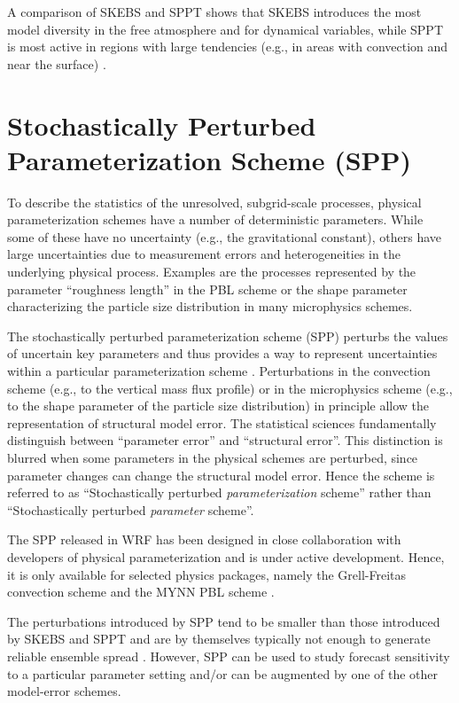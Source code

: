 A comparison of SKEBS and SPPT shows that SKEBS introduces the most model 
diversity in the free atmosphere and for dynamical variables, 
while SPPT is most active in regions with large tendencies (e.g., in areas with convection 
and near the surface) \citep{Be15}.
\section {Stochastically Perturbed Parameterization Scheme (SPP)}
To describe the statistics of the unresolved, subgrid-scale processes, 
physical parameterization schemes have a number of deterministic parameters.
While some of these have no uncertainty (e.g., the gravitational constant), 
others have large uncertainties due to 
measurement errors and heterogeneities in the underlying physical process.
Examples are the processes represented by the parameter ``roughness length'' in the PBL 
scheme or the shape parameter characterizing the particle size distribution in 
many microphysics schemes.  

The stochastically perturbed parameterization scheme (SPP)
perturbs the values of uncertain key parameters and thus provides 
a way to represent uncertainties within a particular parameterization scheme
\citep{Bo08,Ha11a}.
Perturbations in the convection scheme (e.g., to the vertical mass flux 
profile) or in the microphysics scheme (e.g., to the shape parameter of 
the particle size distribution) in principle allow the representation of
structural model error.  The statistical sciences fundamentally 
distinguish between ``parameter error'' and 
``structural error''. This distinction is blurred when some parameters in 
the physical schemes are perturbed, since parameter changes
can change the structural model error. Hence the scheme is referred to as 
``Stochastically perturbed \textit {parameterization} scheme'' rather than
``Stochastically perturbed \textit {parameter} scheme''. 

The SPP released in WRF has been designed in close collaboration with 
developers of physical parameterization and is under active development. 
Hence, it is only available for selected physics packages, namely the 
Grell-Freitas convection scheme and the MYNN PBL scheme \citep{jankov2017performance}.

The perturbations introduced by SPP tend to be smaller than those
introduced by SKEBS and SPPT and are by themselves typically not enough to
generate reliable ensemble spread \citep{Be15}.  However, SPP can be used 
to study forecast sensitivity to a particular parameter setting and/or
can be augmented by one of the other model-error schemes.

